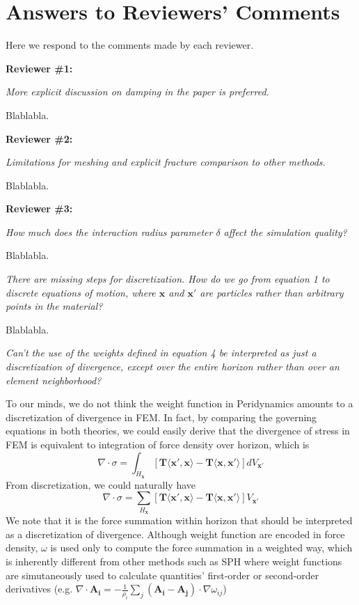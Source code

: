 \section{Answers to Reviewers' Comments}

Here we respond to the comments made by each reviewer.

\noindent{}\textbf{Reviewer \#1:}

\emph{More explicit discussion on damping in the paper is preferred.}

Blablabla.

\noindent{}\textbf{Reviewer \#2:}

\emph{Limitations for meshing and explicit fracture comparison to other methods.}

Blablabla.

\noindent{}\textbf{Reviewer \#3:}

\emph{How much does the interaction radius parameter $\delta$ affect the simulation quality?}

Blablabla.

\emph{There are missing steps for discretization. How do we go from equation 1 to discrete equations of motion, where $\mathbf{x}$ and $\mathbf{x'}$ are particles rather than arbitrary points in the material? }

Blablabla.

\emph{Can't the use of the weights defined in equation 4 be interpreted as just a discretization of divergence, except over the entire horizon rather than over an element neighborhood?}

To our minds, we do not think the weight function in Peridynamics amounts to a discretization of divergence in FEM.
In fact, by comparing the governing equations in both theories, we could easily derive that
the divergence of stress in FEM is equivalent to integration of force density over horizon, which is
\begin{equation}
\nabla\cdot\sigma = \int_{H_\mathbf{x}}[\mathbf{T}\langle\mathbf{x}',\mathbf{x}\rangle - \mathbf{T}\langle\mathbf{x},\mathbf{x}'\rangle]dV_{\mathbf{x}'}
\end{equation}
From discretization, we could naturally have
\begin{equation}
\nabla\cdot\sigma = \sum_{H_\mathbf{x}}[\mathbf{T}\langle\mathbf{x}',\mathbf{x}\rangle - \mathbf{T}\langle\mathbf{x},\mathbf{x}'\rangle]V_{\mathbf{x}'}
\end{equation}
We note that it is the force summation within horizon that should be interpreted as a discretization of divergence.
Although weight function are encoded in force density, $\omega$ is used only to compute the force summation in a weighted way, which is inherently different from other methods such as SPH where weight functions are simutaneously used to calculate quantities' first-order or second-order derivatives
(e.g. $\nabla\cdot\mathbf{A_i} = -\frac{1}{\rho_i}\sum_j(\mathbf{A_i - A_j})\cdot\nabla\omega_{ij}$)

